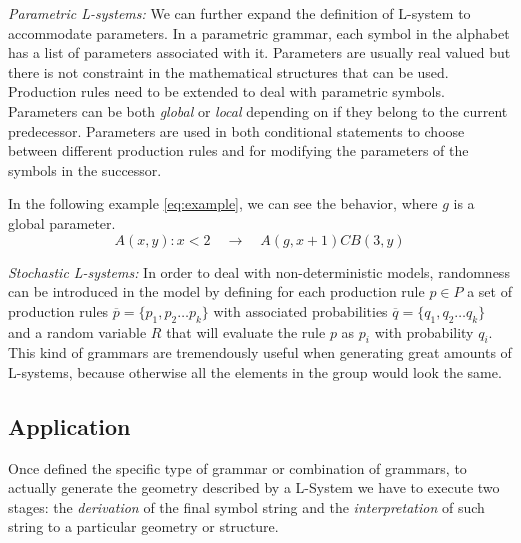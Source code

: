 \documentclass[letterpaper,twoside,11pt]{article}
\begin{document}
\begin{multicols}{2}
\emph{Parametric L-systems:} We can further expand the definition of L-system to accommodate parameters. In a parametric grammar, each symbol in the alphabet has a list of parameters associated with it. Parameters are usually real valued but there is not constraint in the mathematical structures that can be used. Production rules need to be extended to deal with parametric symbols. Parameters can be both \emph{global} or \emph{local} depending on if they belong to the current predecessor. Parameters are used in both conditional statements to choose between different production rules and for modifying the parameters of the symbols in the successor.

In the following example \eqref{eq:example}, we can see the behavior, where $g$ is a global parameter.
\begin{equation}
\label{eq:example}
	A(x,y) : x < 2 \quad\rightarrow\quad A(g,x+1) C B(3,y)
\end{equation}

\emph{Stochastic L-systems:} In order to deal with non-deterministic models, randomness can be introduced in the model by defining for each production rule $p \in P$ a set of production rules $\overline{p} = \{p_1,p_2\ldots p_k\}$ with associated probabilities $\overline{q} = \{q_1,q_2\ldots q_k\}$ and a random variable $R$ that will evaluate the rule $p$ as $p_i$ with probability $q_i$. This kind of grammars are tremendously useful when generating great amounts of L-systems, because otherwise all the elements in the group would look the same.


\subsection{Application} %
\label{sub:application}

Once defined the specific type of grammar or combination of grammars, to actually generate the geometry described by a L-System we have to execute two stages: the \emph{derivation} of the final symbol string and the \emph{interpretation} of such string to a particular geometry or structure.


\end{multicols}
\end{document}
